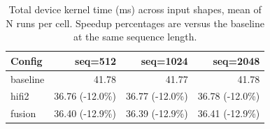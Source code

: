 \begin{table}[h]
\centering
\small
\caption{Total device kernel time (ms) across input shapes, mean of N runs per cell. Speedup percentages are versus the baseline at the same sequence length.}
\label{tab:shape-sweep}
\begin{tabular}{lrrr}
\toprule
Config & seq=512 & seq=1024 & seq=2048 \\
\midrule
baseline & 41.78 & 41.77 & 41.78 \\
hifi2 & 36.76 (-12.0\%) & 36.77 (-12.0\%) & 36.78 (-12.0\%) \\
fusion & 36.40 (-12.9\%) & 36.39 (-12.9\%) & 36.41 (-12.9\%) \\
\bottomrule
\end{tabular}
\end{table}
